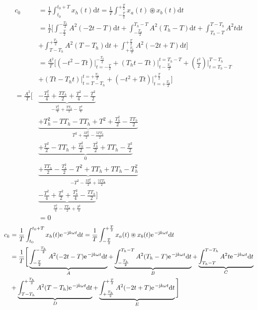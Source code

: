 \documentclass[11pt,a4paper,DIV=12]{scrartcl}
\newcommand{\diff}{\mathrm{d}}
\begin{document}
\begin{align}
	c_0&=\frac{1}{T}\int_{t_0}^{t_0+T}x_{h}(t)\diff t=\frac{1}{T}\int_{-\frac{T}{2}}^{+\frac{T}{2}}x_{a}(t)\circledast x_{b}(t)\diff t\nonumber \\
	&=\frac{1}{T}\Bigg [\int_{-\frac{T}{2}}^{-\frac{T_h}{2}}A^2(-2t-T)\diff t+\int_{-\frac{T_h}{2}}^{T_h-T}A^2(T_h-T)\diff t+\int_{T_h-T}^{T-T_h}A^2t\diff t\nonumber \\
	&+\int_{T-T_h}^{+\frac{T_h}{2}}A^2(T-T_h)\diff t+\int_{+\frac{T_h}{2}}^{+\frac{T}{2}}A^2(-2t+T)\diff t\Bigg ]\nonumber \\
	&=\frac{A^2}{T}\Bigg [(-t^2-Tt)\Bigg |_{t=-\frac{T}{2}}^{-\frac{T_h}{2}}+(T_ht-Tt)\Bigg |_{t-\frac{T_h}{2}}^{t=T_h-T}+(\frac{t^2}{2})\Bigg |_{t=T_h-T}^{T-T_h}\nonumber \\
	&+(Tt-T_ht)\Bigg |_{t=T-T_h}^{t=+\frac{T_h}{2}}+(-t^2+Tt)\Bigg |_{t=+\frac{T_h}{2}}^{+\frac{T}{2}}\Bigg ]\nonumber \\
	=\frac{A^2}{T}\Bigg [&\underbrace{-\frac{T_h^2}{4}+\frac{TT_h}{2}+\frac{T^2}{4}-\frac{T^2}{2}}_{-\frac{T_h^2}{4}+\frac{TT_h}{2}-\frac{T^2}{4}}\nonumber \\
	&\underbrace{+T_h^2-TT_h-TT_h+T^2+\frac{T_h^2}{2} -\frac{TT_h}{2}}_{T^2+\frac{3T_h^2}{2}-\frac{5TT_h}{2}}\nonumber \\
	&\underbrace{+\frac{T^2}{2}-TT_h+\frac{T_h^2}{2}-\frac{T_h^2}{2}+TT_h-\frac{T^2}{2}}_{0}\nonumber \\
	&\underbrace{+\frac{TT_h}{2}-\frac{T_h^2}{2}-T^2+TT_h+TT_h-T_h^2}_{-T^2-\frac{3T_h^2}{2}+\frac{5TT_h}{2}}\nonumber \\
	&\underbrace{-\frac{T^2}{4}+\frac{T^2}{2}+\frac{T_h^2}{4}-\frac{TT_h}{2}}_{\frac{T_h^2}{4}-\frac{TT_h}{2}+\frac{T^2}{4}}\Bigg ]\nonumber \\
	&= 0
\end{align}
\begin{align}
	c_k&=\frac{1}{T}\int_{t_0}^{t_0+T}x_{h}(t)\e^{-\im k \omega t}\diff t=\frac{1}{T}\int_{-\frac{T}{2}}^{+\frac{T}{2}}x_{a}(t)\circledast x_{b}(t)\e^{-\im k \omega t}\diff t\nonumber \\
	&=\frac{1}{T}\Bigg [\underbrace{\int_{-\frac{T}{2}}^{-\frac{T_h}{2}}A^2(-2t-T)\e^{-\im k \omega t}\diff t}_A+\underbrace{\int_{-\frac{T_h}{2}}^{T_h-T}A^2(T_h-T)\e^{-\im k \omega t}\diff t}_B+\underbrace{\int_{T_h-T}^{T-T_h}A^2t\e^{-\im k \omega t}\diff t}_C\nonumber \\
	&+\underbrace{\int_{T-T_h}^{+\frac{T_h}{2}}A^2(T-T_h)\e^{-\im k \omega t}\diff t}_D+\underbrace{\int_{+\frac{T_h}{2}}^{+\frac{T}{2}}A^2(-2t+T)\e^{-\im k \omega t}\diff t}_E\Bigg ]
\end{align}
\end{document}
